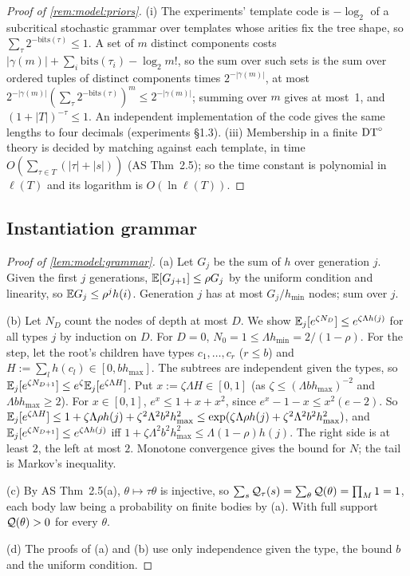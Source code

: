 \begin{proof}[Proof of \cref{rem:model:priors}]
(i) The experiments' template code is $-\log_2$ of a subcritical stochastic grammar over templates whose arities fix the tree shape, so $\sum_\tau2^{-\mathrm{bits}(\tau)}\le1$. A set of $m$ distinct components costs $|\gamma(m)|+\sum_i\mathrm{bits}(\tau_i)-\log_2m!$, so the sum over such sets is the sum over ordered tuples of distinct components times $2^{-|\gamma(m)|}$, at most $2^{-|\gamma(m)|}(\sum_\tau2^{-\mathrm{bits}(\tau)})^m\le2^{-|\gamma(m)|}$; summing over $m$ gives at most~1, and $(1+|T|)^{-\tau}\le1$. An independent implementation of the code gives the same lengths to four decimals (experiments \S1.3). (iii) Membership in a finite $\mathrm{DT}^{\circ}$ theory is decided by matching against each template, in time $O(\sum_{\tau\in T}(|\tau|+|s|))$ (AS Thm~2.5); so the time constant is polynomial in $\ell(T)$ and its logarithm is $O(\ln\ell(T))$.
\end{proof}

\subsection{Instantiation grammar}\label{app:model:grammar}

\begin{proof}[Proof of \cref{lem:model:grammar}]
(a) Let $G_j$ be the sum of $h$ over generation $j$. Given the first $j$ generations, $\mathbb{E}[G_{j+1}]\le\rho G_j$ by the uniform condition and linearity, so $\mathbb{E} G_j\le\rho^jh(i)$. Generation $j$ has at most $G_j/h_{\min}$ nodes; sum over $j$.

(b) Let $N_D$ count the nodes of depth at most $D$. We show $\mathbb{E}_j[e^{\zeta N_D}]\le e^{\zeta\Lambda h(j)}$ for all types $j$ by induction on $D$. For $D=0$, $N_0=1\le\Lambda h_{\min}=2/(1-\rho)$. For the step, let the root's children have types $c_1,\dots,c_r$ ($r\le b$) and $H:=\sum_lh(c_l)\in[0,bh_{\max}]$. The subtrees are independent given the types, so $\mathbb{E}_j[e^{\zeta N_{D+1}}]\le e^\zeta\mathbb{E}_j[e^{\zeta\Lambda H}]$. Put $x:=\zeta\Lambda H\in[0,1]$ (as $\zeta\le(\Lambda bh_{\max})^{-2}$ and $\Lambda bh_{\max}\ge2$). For $x\in[0,1]$, $e^x\le1+x+x^2$, since $e^x-1-x\le x^2(e-2)$. So $\mathbb{E}_j[e^{\zeta\Lambda H}]\le1+\zeta\Lambda\rho h(j)+\zeta^2\Lambda^2b^2h_{\max}^2\le\exp(\zeta\Lambda\rho h(j)+\zeta^2\Lambda^2b^2h_{\max}^2)$, and $\mathbb{E}_j[e^{\zeta N_{D+1}}]\le e^{\zeta\Lambda h(j)}$ iff $1+\zeta\Lambda^2b^2h_{\max}^2\le\Lambda(1-\rho)h(j)$. The right side is at least $2$, the left at most $2$. Monotone convergence gives the bound for $N$; the tail is Markov's inequality.

(c) By AS Thm~2.5(a), $\theta\mapsto\tau\theta$ is injective, so $\sum_s\mathcal{Q}_\tau(s)=\sum_\theta\mathcal{Q}(\theta)=\prod_M1=1$, each body law being a probability on finite bodies by (a). With full support $\mathcal{Q}(\theta)>0$ for every $\theta$.

(d) The proofs of (a) and (b) use only independence given the type, the bound $b$ and the uniform condition.
\end{proof}

